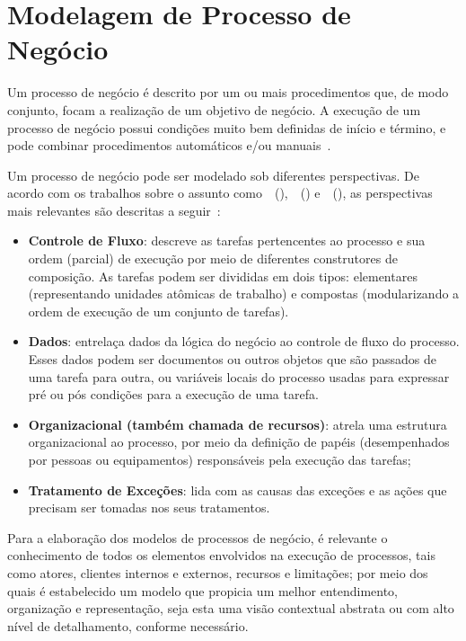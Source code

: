 \chapter{Modelagem de Processo de Negócio}
\label{cp:bpmn}

Um processo de negócio é descrito por um ou mais procedimentos que, de modo conjunto, focam a realização de um objetivo de negócio. A execução de um processo de negócio possui condições muito bem definidas de início e término, e pode combinar procedimentos automáticos e/ou manuais~\cite{braghetto2011tecnicas}. 

Um processo de negócio pode ser modelado sob diferentes perspectivas. De acordo com os trabalhos sobre o assunto como~~(\citeyear{russell2007foundations}),~~(\citeyear{becker2000guidelines}) e~~(\citeyear{curtis1992process}), as perspectivas mais relevantes são descritas a seguir~\cite{braghetto2011tecnicas}:

\begin{itemize}
\item \textbf{Controle de Fluxo}: descreve as tarefas pertencentes ao processo e sua ordem (parcial) de execução por meio de diferentes construtores de composição. As tarefas podem ser divididas em dois tipos: elementares (representando unidades atômicas de trabalho) e compostas (modularizando a ordem de execução de um conjunto de tarefas).

\item \textbf{Dados}: entrelaça dados da lógica do negócio ao controle de fluxo do processo. Esses dados podem ser documentos ou outros objetos que são passados de uma tarefa para outra, ou variáveis locais do processo usadas para expressar pré ou pós condições para a execução de uma tarefa.

\item \textbf{Organizacional (também chamada de recursos)}: atrela uma estrutura organizacional ao processo, por meio da definição de papéis (desempenhados por pessoas ou equipamentos) responsáveis pela execução das tarefas; 

\item \textbf{Tratamento de Exceções}: lida com as causas das exceções e as ações que precisam ser tomadas nos seus tratamentos.

\end{itemize}

Para a elaboração dos modelos de processos de negócio, é relevante o conhecimento de todos os elementos envolvidos na execução de processos, tais como atores, clientes internos e externos, recursos e limitações; por meio dos quais é estabelecido um modelo que propicia um melhor entendimento, organização e representação, seja esta uma visão contextual abstrata ou com alto nível de detalhamento, conforme necessário. 

